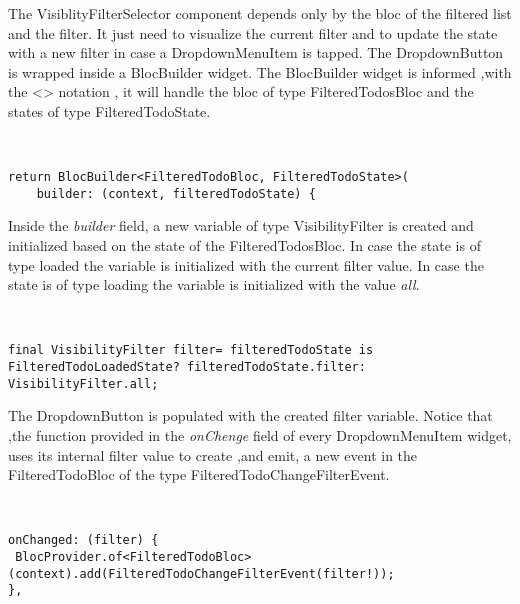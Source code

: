 The VisiblityFilterSelector component depends only by the bloc of the filtered list and the filter. It just need to visualize the current filter and to update the state with a new filter in case a DropdownMenuItem is tapped. The DropdownButton is  wrapped inside a BlocBuilder widget. The BlocBuilder widget is informed ,with the <> notation , it will handle the bloc of type FilteredTodosBloc and the states of type FilteredTodoState. 
\begin{code}
\mbox{}\\
 \mbox{}
\label{code:2.14}
\begin{verbatim}
return BlocBuilder<FilteredTodoBloc, FilteredTodoState>(
    builder: (context, filteredTodoState) {
\end{verbatim}
\mbox{}
\end{code}

Inside the \textit{builder }field, a new variable of type VisibilityFilter is created and initialized based on the state of the FilteredTodosBloc. In case the state is of type loaded the variable is initialized with the current filter value. In case the state is of type loading the variable is initialized with the value \textit{all}.
\begin{code}
\mbox{}\\
 \mbox{}
\label{code:2.14}
\begin{verbatim}
final VisibilityFilter filter= filteredTodoState is FilteredTodoLoadedState? filteredTodoState.filter: VisibilityFilter.all;
\end{verbatim}
\mbox{}
\end{code}

The DropdownButton is populated with the created filter variable. Notice that ,the function provided in the \textit{onChenge} field of every DropdownMenuItem widget, uses its internal filter value to create ,and  emit, a new event in the FilteredTodoBloc of the type FilteredTodoChangeFilterEvent.
\begin{code}
\mbox{}\\
 \mbox{}
\label{code:2.14}
\begin{verbatim}
onChanged: (filter) {
 BlocProvider.of<FilteredTodoBloc>(context).add(FilteredTodoChangeFilterEvent(filter!));
},
\end{verbatim}
\mbox{}
\end{code}

